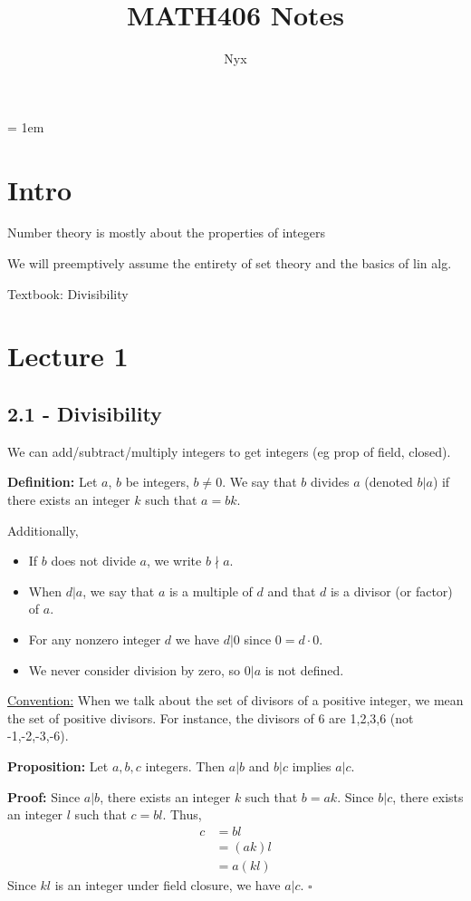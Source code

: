 \documentclass{article}
\title{MATH406 Notes}
\newcommand*{\qed}{\hfill$\square$}%
\begin{document}
\author{Nyx}
\maketitle

\parskip = 1em
\pgfplotsset{compat=1.17}
\setcounter{section}{0}

\section{Intro}

Number theory is mostly about the properties of integers 

We will preemptively assume the entirety of set theory and the basics of lin alg. 

Textbook: Divisibility

\section{Lecture 1}

\subsection{2.1 - Divisibility}

We can add/subtract/multiply integers to get integers (eg prop of field, closed).

\textbf{Definition:} Let $a$, $b$ be integers, $b \neq 0$. We say that $b$ divides $a$ (denoted $b|a$) if there exists an integer $k$ such that $a = bk$.

Additionally, 
\begin{itemize}
    \item If $b$ does not divide $a$, we write $b \nmid a$.
    \item When $d|a$, we say that $a$ is a multiple of $d$ and that $d$ is a divisor (or factor) of $a$.
    \item For any nonzero integer $d$ we have $d|0$ since $0 = d \cdot 0$.
    \item We never consider division by zero, so $0|a$ is not defined.
\end{itemize}

\underline{Convention:} When we talk about the set of divisors of a positive integer, we mean the set of positive divisors. For instance, the divisors of 6 are 1,2,3,6 (not -1,-2,-3,-6).

\textbf{Proposition:} Let $a,b,c$ integers. Then $a|b$ and $b|c$ implies $a|c$.

\textbf{Proof:} Since $a|b$, there exists an integer $k$ such that $b = ak$. Since $b|c$, there exists an integer $l$ such that $c = bl$. Thus, \begin{align*}
    c &= bl \\
      &= (ak)l \\
      &= a(kl)
\end{align*}
Since $kl$ is an integer under field closure, we have $a|c$. \qed
\end{document}
